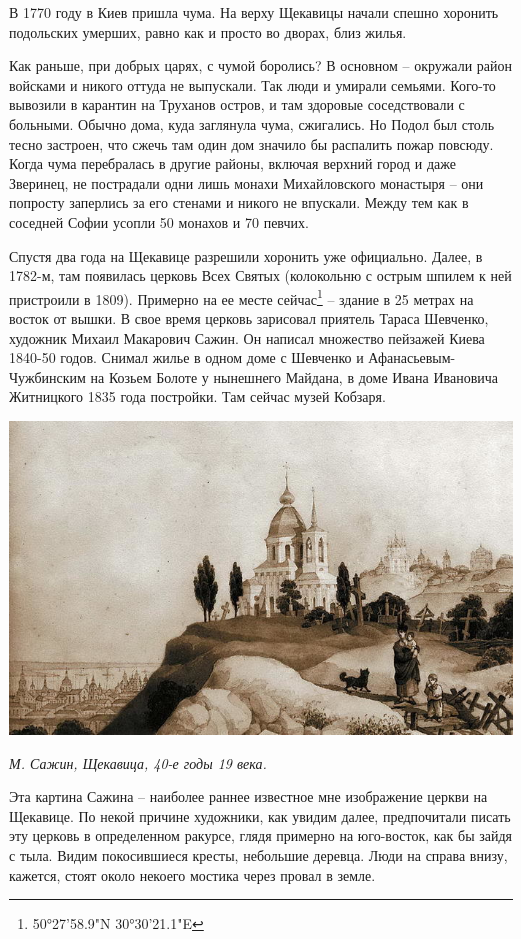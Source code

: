 В 1770 году в Киев пришла чума. На верху Щекавицы начали спешно хоронить подольских умерших, равно как и просто во дворах, близ жилья.

Как раньше, при добрых царях, с чумой боролись? В основном – окружали район войсками и никого оттуда не выпускали. Так люди и умирали семьями. Кого-то вывозили в карантин на Труханов остров, и там здоровые соседствовали с больными. Обычно дома, куда заглянула чума, сжигались. Но Подол был столь тесно застроен, что сжечь там один дом значило бы распалить пожар повсюду. Когда чума перебралась в другие районы, включая верхний город и даже Зверинец, не пострадали одни лишь монахи Михайловского монастыря – они попросту заперлись за его стенами и никого не впускали. Между тем как в соседней Софии усопли 50 монахов и 70 певчих.

Спустя два года на Щекавице разрешили хоронить уже официально. Далее, в 1782-м, там появилась церковь Всех Святых (колокольню с острым шпилем к ней пристроили в 1809). Примерно на ее месте сейчас\footnote{50°27'58.9"N 30°30'21.1"E} – здание в 25 метрах на восток от вышки. В свое время церковь зарисовал приятель Тараса Шевченко, художник Михаил Макарович Сажин. Он написал множество пейзажей Киева 1840-50 годов. Снимал жилье в одном доме с Шевченко и Афанасьевым-Чужбинским на Козьем Болоте у нынешнего Майдана, в доме Ивана Ивановича Житницкого 1835 года постройки. Там сейчас музей Кобзаря.

\begin{center}
\includegraphics[width=\textwidth]{chast-colebanie-osnov/sheka/shekavica-sajin.jpg}

\textit{М. Сажин, Щекавица, 40-е годы 19 века.}
\end{center}

Эта картина Сажина – наиболее раннее известное мне изображение церкви на Щекавице. По некой причине художники, как увидим далее, предпочитали писать эту церковь в определенном ракурсе, глядя примерно на юго-восток, как бы зайдя с тыла. Видим покосившиеся кресты, небольшие деревца. Люди на справа внизу, кажется, стоят около некоего мостика через провал в земле. 

